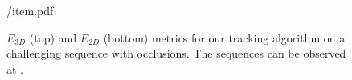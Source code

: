 \begin{figure}[h!]
\centering
\begin{overpic} 
[width=\linewidth]
{\currfiledir/item.pdf}
\end{overpic}
\caption{
% 
$E_{3D}$ (top) and $E_{2D}$ (bottom) metrics for our tracking algorithm on a challenging sequence with occlusions.
%
The sequences can be observed at \VideoLimOcclusions{}.
% 
}
\label{fig:occlusion}
\end{figure}